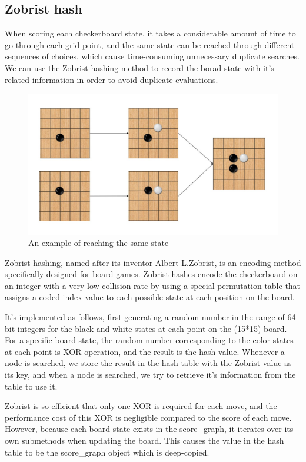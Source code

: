 \documentclass[a4paper, 12pt]{article} %
\begin{document}
\begin{multicols}{2}
    \subsection{Zobrist hash}
    When scoring each checkerboard state, it takes a considerable amount of time to go through each grid point, and the same state can be reached through different sequences of choices, which cause time-consuming unnecessary duplicate searches. We can use the Zobrist hashing method to record the borad state with it's related information in order to avoid duplicate evaluations.
    \begin{figure}[H]
    \centering
    \includegraphics[scale=0.25]{figure1.jpg}
    \caption{An example of reaching the same state}
    \label{figure}
    \end{figure}
    Zobrist hashing, named after its inventor Albert L.Zobrist, is an encoding method specifically designed for board games. Zobrist hashes encode the checkerboard on an integer with a very low collision rate by using a special permutation table that assigns a coded index value to each possible state at each position on the board.
    
    It's implemented as follows, first generating a random number in the range of 64-bit integers for the black and white states at each point on the (15*15) board. For a specific board state, the random number corresponding to the color states at each point is XOR operation, and the result is the hash value. Whenever a node is searched, we store the result in the hash table with the Zobrist value as its key, and when a node is searched, we try to retrieve it's information from the table to use it.
    
    Zobrist is so efficient that only one XOR is required for each move, and the performance cost of this XOR is negligible compared to the score of each move. However, because each board state exists in the score\_graph, it iterates over its own submethods when updating the board. This causes the value in the hash table to be the score\_graph object which is deep-copied.
    

\end{multicols}
\end{document}
